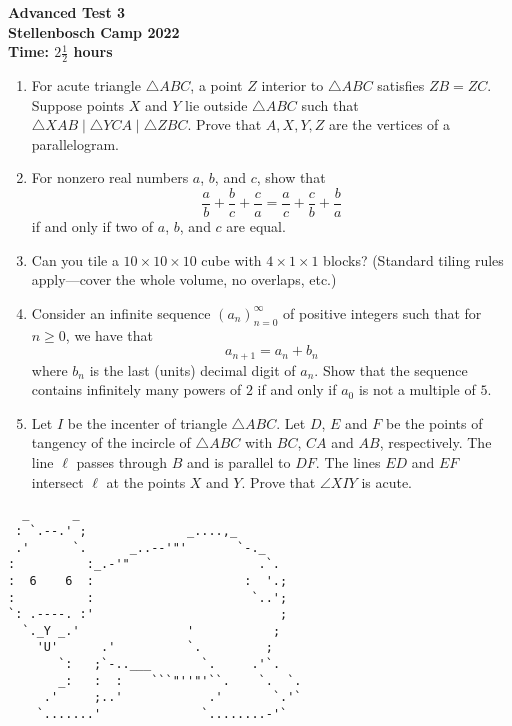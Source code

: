 \documentclass{article}
\begin{document}
\thispagestyle{empty}

\begin{center}
  \textbf{\Large Advanced Test 3}
  \\ \vspace{1em}
  \textbf{\large Stellenbosch Camp 2022}
  \\ \vspace{1em}
  \textbf{\large Time: $2\frac{1}{2}$ hours}
\end{center}

\bigskip

\begin{enumerate}[itemsep=\fill]

\item %
For acute triangle $\triangle ABC$, a point $Z$ interior to $\triangle ABC$ satisfies $ZB = ZC$.
Suppose points $X$ and $Y$ lie outside $\triangle ABC$ such that $\triangle XAB \mathop{|||} \triangle YCA \mathop{|||} \triangle ZBC$.
Prove that $A,X,Y,Z$ are the vertices of a parallelogram.


\item %
For nonzero real numbers $a$, $b$, and $c$, show that
\[ \frac{a}{b} +\frac{b}{c} +\frac{c}{a} = \frac{a}{c} +\frac{c}{b} +\frac{b}{a} \]
if and only if two of $a$, $b$, and $c$ are equal.


\item %
Can you tile a $10\times 10\times 10$ cube with $4\times 1\times 1$ blocks? (Standard tiling rules apply---cover the whole volume, no overlaps, etc.)


\item %
Consider an infinite sequence $(a_n)_{n=0}^{\infty}$ of positive integers such that for $n \geq 0$, we have that
\[
    a_{n + 1} = a_n + b_n
\]
where $b_n$ is the last (units) decimal digit of $a_n$. Show that the sequence contains infinitely many powers of $2$ if and only if $a_0$ is not a multiple of $5$.


\item %
Let $I$ be the incenter of triangle $\triangle ABC$.
Let $D$, $E$ and $F$ be the points of tangency of the incircle of $\triangle ABC$ with $BC$, $CA$ and $AB$, respectively.
The line $\ell$ passes through $B$ and is parallel to $DF$.
The lines $ED$ and $EF$ intersect $\ell$ at the points $X$ and $Y$.
Prove that $\angle XIY$ is acute.

\end{enumerate}


\vfill
\centering
\small
\begin{BVerbatim}
  _      _                        
 : `.--.' ;              _....,_  
 .'      `.      _..--'"'       `-._
:          :_.-'"                  .`.
:  6    6  :                     :  '.;
:          :                      `..';
`: .----. :'                          ;
  `._Y _.'               '           ;
    'U'      .'          `.         ; 
       `:   ;`-..___       `.     .'`.
       _:   :  :    ```"''"'``.    `.  `.
     .'     ;..'            .'       `.'`
    `.......'              `........-'`
\end{BVerbatim}
\end{document}

